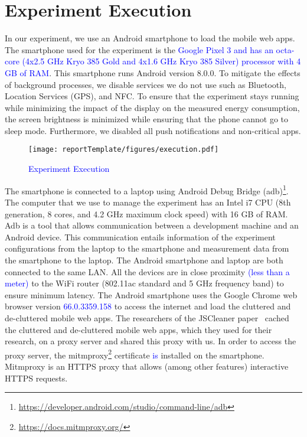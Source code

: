 
\section{Experiment Execution}\label{sec:experumnent_executuon}

In our experiment, we use an Android smartphone to load the mobile web apps. The smartphone used for the experiment is the \textcolor{blue}{Google Pixel 3 and has an octa-core (4x2.5 GHz Kryo 385 Gold and 4x1.6 GHz Kryo 385 Silver) processor with 4 GB of RAM}. This smartphone runs Android version 8.0.0. To mitigate the effects of background processes, we disable services we do not use such as Bluetooth, Location Services (GPS), and NFC. To ensure that the experiment stays running while minimizing the impact of the display on the measured energy consumption, the screen brightness is minimized while ensuring that the phone cannot go to sleep mode. Furthermore, we disabled all push notifications and non-critical apps. 

\begin{figure}[h]
\centering
\texttt{[image: reportTemplate/figures/execution.pdf]}
\caption{\textcolor{blue}{Experiment Execution}} \label{fig:deploymentview}
\end{figure}

The smartphone is connected to a laptop using Android Debug Bridge (adb)\footnote{\url{https://developer.android.com/studio/command-line/adb}}. The computer that we use to manage the experiment has an Intel i7 CPU (8th generation, 8 cores, and 4.2 GHz maximum clock speed) with 16 GB of RAM. Adb is a tool that allows communication between a development machine and an Android device. This communication entails information of the experiment configurations from the laptop to the smartphone and measurement data from the smartphone to the laptop. The Android smartphone and laptop are both connected to the same LAN. All the devices are in close proximity \textcolor{blue}{(less than a meter)} to the WiFi router (802.11ac standard and 5 GHz frequency band) to ensure minimum latency. The Android smartphone uses the Google Chrome web browser version \textcolor{blue}{{66.0.3359.158}} to access the internet and load the cluttered and de-cluttered mobile web apps. The researchers of the JSCleaner paper~\cite{chaqfeh2020jscleaner} cached the cluttered and de-cluttered mobile web apps, which they used for their research, on a proxy server and shared this proxy with us. In order to access the proxy server, the mitmproxy\footnote{\url{https://docs.mitmproxy.org/}} certificate \textcolor{blue}{is} installed on the smartphone. Mitmproxy is an HTTPS proxy that allows (among other features) interactive HTTPS requests. 

